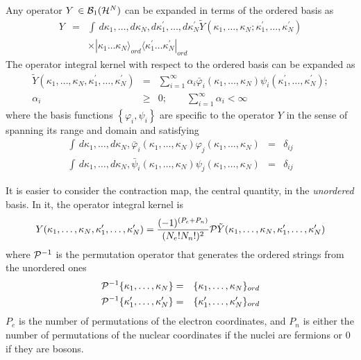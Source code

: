 Any operator $Y\,\in {\cal B}_{1}({\cal H}^{N})$ can be expanded in terms of
the ordered basis as 
\begin{eqnarray}
Y &=&\int \,d\kappa _{1},\ldots ,d\kappa _{N},d\kappa _{1}^{\prime },\ldots
,d\kappa _{N}^{\prime }\tilde{Y}(\kappa _{1},\ldots ,\kappa _{N};\kappa
_{1}^{\prime },\ldots ,\kappa _{N}^{\prime })  \nonumber \\
&&\times |\kappa _{1}\ldots \kappa _{N}\rangle _{ord}\langle \kappa
_{1}^{\prime }\ldots \kappa _{N}^{\prime }|_{ord}
\end{eqnarray}%
The operator integral kernel with respect to the ordered basis can be
expanded \cite{Richtmyer} as 
\begin{eqnarray}
\tilde{Y}(\kappa _{1},\ldots ,\kappa _{N},\kappa _{1}^{\prime },\ldots
,\kappa _{N}^{\prime }) &=&\sum_{i=1}^{\infty }\alpha _{i}\bar{\varphi}%
_{i}(\kappa _{1},\ldots ,\kappa _{N})\psi _{i}(\kappa _{1}^{\prime },\ldots
,\kappa _{N}^{\prime });  \nonumber \\
\alpha _{i} &\geq &0; \qquad \sum_{i=1}^{\infty }\alpha _{i}<\infty
\end{eqnarray}%
where the basis functions $\left\{ \varphi _{i},\psi _{i}\right\} $ are
specific to the operator $Y$ in the sense of spanning its range and domain
and satisfying 
\begin{eqnarray}
\int \,d\kappa _{1},\ldots ,d\kappa _{N},\bar{\varphi}_{i}(\kappa
_{1},\ldots ,\kappa _{N})\varphi _{j}(\kappa _{1},\ldots ,\kappa _{N})
&=&\delta _{ij}  \nonumber \\
\int \,d\kappa _{1},\ldots ,d\kappa _{N},\bar{\psi}_{i}(\kappa _{1},\ldots
,\kappa _{N})\psi _{j}(\kappa _{1},\ldots ,\kappa _{N}) &=&\delta _{ij}
\end{eqnarray}

It is easier to consider the contraction map, the central quantity, in the 
{\em unordered} basis. In it, the operator integral kernel is 
\begin{equation}
Y(\kappa _{1},\ldots ,\kappa _{N},\kappa _{1}^{\prime },\ldots ,\kappa
_{N}^{\prime })=\frac{(-1)^{(P_{e}+P_{n})}}{(N_{e}!N_{n}!)^{2}}{\cal P}%
\tilde{Y}(\kappa _{1},\ldots ,\kappa _{N},\kappa _{1}^{\prime },\ldots
,\kappa _{N}^{\prime })
\end{equation}%
where ${\cal P}^{-1}$ is the permutation operator that generates the ordered
strings from the unordered ones 
\begin{eqnarray}
{\cal P}^{-1}\{\kappa _{1},\ldots ,\kappa _{N}\} &=&\{\kappa _{1},\ldots
,\kappa _{N}\}_{ord}  \nonumber \\
{\cal P}^{-1}\{\kappa _{1}^{\prime },\ldots ,\kappa _{N}^{\prime }\}
&=&\{\kappa _{1}^{\prime },\ldots ,\kappa _{N}^{\prime }\}_{ord}
\end{eqnarray}%
$P_{e}$ is the number of permutations of the electron coordinates, and $%
P_{n} $ is either the number of permutations of the nuclear coordinates if
the nuclei are fermions or $0$ if they are bosons.

